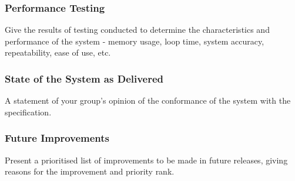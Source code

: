 \documentclass[MTRX3700report.tex]{subfiles}
\begin{document}
\setcounter{subsection}{1} %


\subsubsection{Performance Testing}
Give the results of testing conducted to determine the characteristics and performance of the system - memory usage, loop time, system accuracy, repeatability, ease of use, etc.
\subsubsection{State of the System as Delivered}
A statement of your group’s opinion of the conformance of the system with the specification.
\subsubsection{Future Improvements}
Present a prioritised list of improvements to be made in future releases, giving reasons for the improvement and priority rank.
\end{document}
